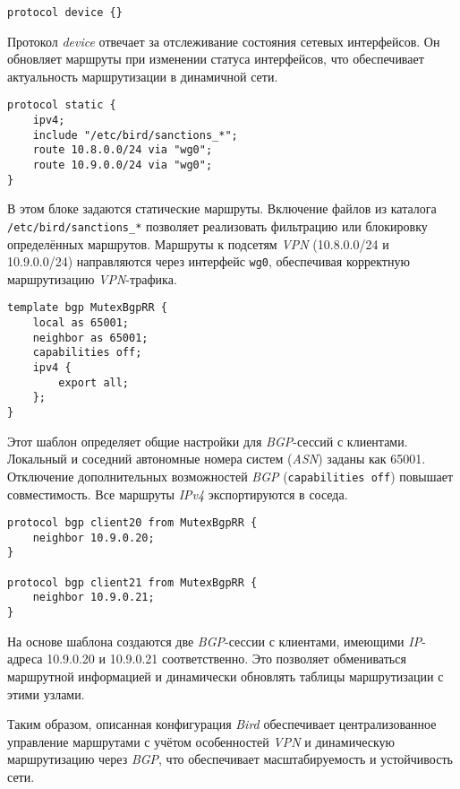 \begin{lstlisting}
protocol device {}
\end{lstlisting}

Протокол \textit{device} отвечает за отслеживание состояния сетевых интерфейсов. Он обновляет маршруты при изменении статуса интерфейсов, что обеспечивает актуальность маршрутизации в динамичной сети.

\begin{lstlisting}
protocol static {
    ipv4;
    include "/etc/bird/sanctions_*";
    route 10.8.0.0/24 via "wg0";
    route 10.9.0.0/24 via "wg0";
}
\end{lstlisting}

В этом блоке задаются статические маршруты. Включение файлов из каталога \lstinline|/etc/bird/sanctions_*| позволяет реализовать фильтрацию или блокировку определённых маршрутов. Маршруты к подсетям \textit{VPN} (10.8.0.0/24 и 10.9.0.0/24) направляются через интерфейс \lstinline{wg0}, обеспечивая корректную маршрутизацию \textit{VPN}-трафика.

\begin{lstlisting}
template bgp MutexBgpRR {
    local as 65001;
    neighbor as 65001;
    capabilities off;
    ipv4 {
        export all;
    };
}
\end{lstlisting}

Этот шаблон определяет общие настройки для \textit{BGP}-сессий с клиентами. Локальный и соседний автономные номера систем (\textit{ASN}) заданы как 65001. Отключение дополнительных возможностей \textit{BGP} (\lstinline{capabilities off}) повышает совместимость. Все маршруты \textit{IPv4} экспортируются в соседа.

\begin{lstlisting}
protocol bgp client20 from MutexBgpRR {
    neighbor 10.9.0.20;
}

protocol bgp client21 from MutexBgpRR {
    neighbor 10.9.0.21;
}
\end{lstlisting}

На основе шаблона создаются две \textit{BGP}-сессии с клиентами, имеющими \textit{IP}-адреса 10.9.0.20 и 10.9.0.21 соответственно. Это позволяет обмениваться маршрутной информацией и динамически обновлять таблицы маршрутизации с этими узлами.

Таким образом, описанная конфигурация \textit{Bird} обеспечивает централизованное управление маршрутами с учётом особенностей \textit{VPN} и динамическую маршрутизацию через \textit{BGP}, что обеспечивает масштабируемость и устойчивость сети.

